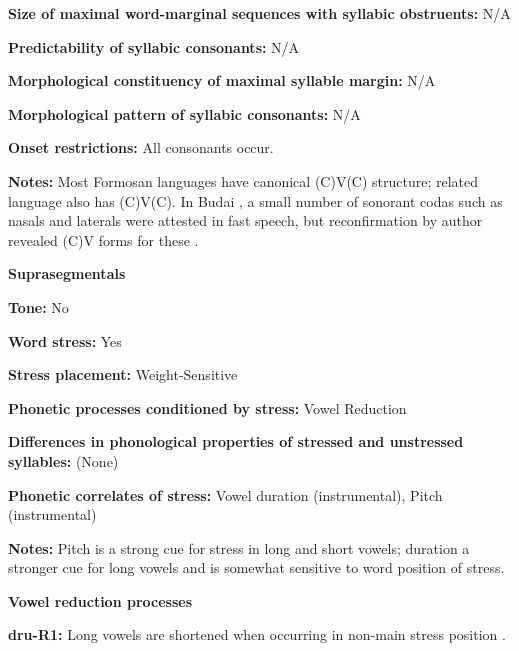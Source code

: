 \textbf{Size of maximal word{}-marginal sequences with syllabic obstruents:} N/A



\textbf{Predictability of syllabic consonants:} N/A



\textbf{Morphological constituency of maximal syllable margin:} N/A



\textbf{Morphological pattern of syllabic consonants:} N/A



\textbf{Onset restrictions:} All consonants occur.



\textbf{Notes:} Most Formosan languages have canonical (C)V(C) structure; related language  also has (C)V(C). In Budai , a small number of sonorant codas such as nasals and laterals were attested in fast speech, but reconfirmation by author revealed (C)V forms for these \citep[213]{Chen2006}.



\textbf{Suprasegmentals}



\textbf{Tone:} No



\textbf{Word stress:} Yes



\textbf{Stress placement:} Weight-Sensitive



\textbf{Phonetic processes conditioned by stress:} Vowel Reduction



\textbf{Differences in phonological properties of stressed and unstressed syllables:} (None)



\textbf{Phonetic correlates of stress:} Vowel duration (instrumental), Pitch (instrumental)



\textbf{Notes:} Pitch is a strong cue for stress in long and short vowels; duration a stronger cue for long vowels and is somewhat sensitive to word position of stress.



\textbf{Vowel reduction processes}



\textbf{dru-R1:} Long vowels are shortened when occurring in non-main stress position \citep[257]{Chen2006}.



